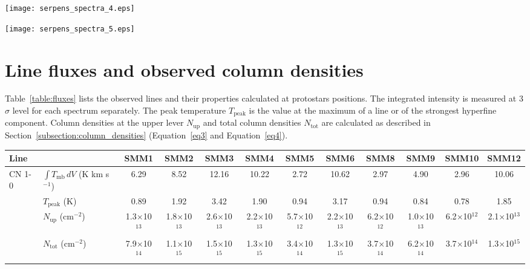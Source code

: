 \documentclass{aa}
\begin{document}
\begin{appendix}
\begin{figure*}
\centering 
\texttt{[image: serpens\_spectra\_4.eps]}
\label{Spectra4} 
\end{figure*}

\begin{figure*} 
\centering
\texttt{[image: serpens\_spectra\_5.eps]} 
\caption{Serpens Main sources spectra of CO 6-5, C$^{34}$S 3-2, CS 3-2 , H$^{13}$CN 2-1, H$^{13}$CN 1-0,
HCN 1-0 and CN 1-0 lines.} 
\label{Spectra_all}
\end{figure*}

\section{Line fluxes and observed column densities}
\label{app:fluxes}

Table~\ref{table:fluxes} lists the observed lines and their properties calculated at protostars positions. The integrated intensity is measured at 3$\sigma$ level for each spectrum separately. The peak temperature $T_\mathrm{peak}$ is the value at the maximum of a line or of the strongest hyperfine component. Column densities at the upper lever $N_\mathrm{up}$ and total column densities $N_\mathrm{tot}$ are calculated as described in Section~\ref{subsection:column_densities} (Equation~\ref{eq3} and Equation~\ref{eq4}).

\begin{sidewaystable*}
\caption{Integrated fluxes of the observed line at the positions of protostars}\label{table:fluxes}
\centering
\begin{tabular}{l l c c c c c c c c c c} 
\hline\hline 
Line & & SMM1 & SMM2 & SMM3 & SMM4 & SMM5 & SMM6 & SMM8 & SMM9 & SMM10 & SMM12 \\
\hline \multirow{4}{*}{CN 1-0} & $\int{T_{\mathrm{mb}} \, dV}$ (K km s$^{-1}$) & 6.29 & 8.52 & 12.16 & 10.22 & 2.72 & 10.62 & 2.97 & 4.90 & 2.96 & 10.06 \\
& $T_\mathrm{peak}$ (K) & 0.89 & 1.92 & 3.42 & 1.90 & 0.94 & 3.17 & 0.94 & 0.84 & 0.78 & 1.85 \\
& $N_\mathrm{up}$ (cm$^{-2}$) & 1.3$\times$10$^{13}$ & 1.8$\times$10$^{13}$ & 2.6$\times$10$^{13}$ & 2.2$\times$10$^{13}$ & 5.7$\times$10$^{12}$ & 2.2$\times$10$^{13}$ & 6.2$\times$10$^{12}$ & 1.0$\times$10$^{13}$ & 6.2$\times$10$^{12}$ & 2.1$\times$10$^{13}$ \\
& $N_\mathrm{tot}$ (cm$^{-2}$) & 7.9$\times$10$^{14}$ & 1.1$\times$10$^{15}$ & 1.5$\times$10$^{15}$ & 1.3$\times$10$^{15}$ & 3.4$\times$10$^{14}$ & 1.3$\times$10$^{15}$ & 3.7$\times$10$^{14}$ & 6.2$\times$10$^{14}$ & 3.7$\times$10$^{14}$ & 1.3$\times$10$^{15}$\\


\end{tabular}
\end{sidewaystable*}
\end{appendix}
\end{document}
